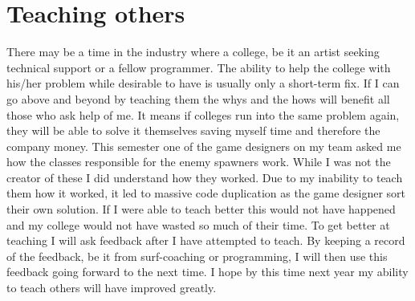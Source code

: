 \documentclass{scrartcl}
\begin{document}
\section{Teaching others}
There may be a time in the industry where a college, be it an artist seeking technical support or a fellow programmer. The ability to help the college with his/her problem while desirable to have is usually only a short-term fix. If I can go above and beyond by teaching them the whys and the hows will benefit all those who ask help of me. It means if colleges run into the same problem again, they will be able to solve it themselves saving myself time and therefore the company money. This semester one of the game designers on my team asked me how the classes responsible for the enemy spawners work. While I was not the creator of these I did understand how they worked. Due to my inability to teach them how it worked, it led to massive code duplication as the game designer sort their own solution. If I were able to teach better this would not have happened and my college would not have wasted so much of their time. To get better at teaching I will ask feedback after I have attempted to teach. By keeping a record of the feedback, be it from surf-coaching or programming, I will then use this feedback going forward to the next time. I hope by this time next year my ability to teach others will have improved greatly.



\end{document}
